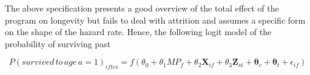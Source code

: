 The above specification presents a good overview of the total effect of the program on longevity but fails to deal with attrition and assumes a specific form on the shape of the hazard rate. Hence, the following logit model of the probability of surviving past 

$$
P(survived\,to\,age\,a=1)_{iftcs} = f(\theta_0 + \theta_1MP_f + \theta_2\mathbf{X}_{if} + \theta_3\mathbf{Z}_{st} + \mathbf{\theta}_c + \mathbf{\theta}_t + \epsilon_{if})
$$